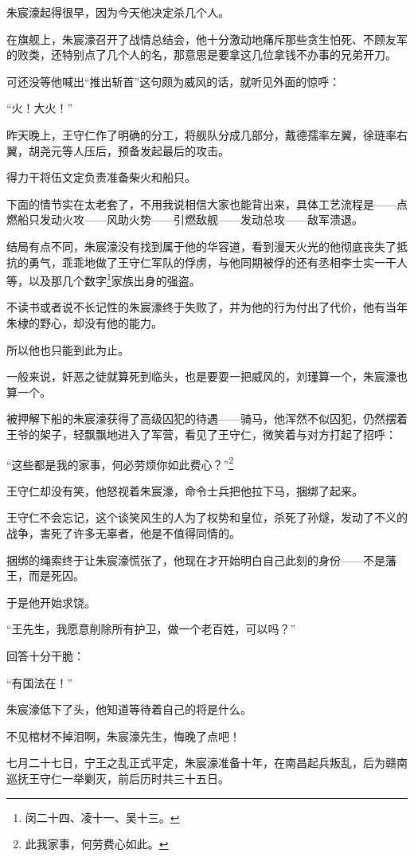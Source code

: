 \begin{multicols}{\theparacolNo}
		朱宸濠起得很早，因为今天他决定杀几个人。

		在旗舰上，朱宸濠召开了战情总结会，他十分激动地痛斥那些贪生怕死、不顾友军的败类，还特别点了几个人的名，那意思是要拿这几位拿钱不办事的兄弟开刀。

		可还没等他喊出“推出斩首”这句颇为威风的话，就听见外面的惊呼：

		“火！大火！”

		昨天晚上，王守仁作了明确的分工，将舰队分成几部分，戴德孺率左翼，徐琏率右翼，胡尧元等人压后，预备发起最后的攻击。

		得力干将伍文定负责准备柴火和船只。

		下面的情节实在太老套了，不用我说相信大家也能背出来，具体工艺流程是——点燃船只发动火攻——风助火势——引燃敌舰——发动总攻——敌军溃退。

		结局有点不同，朱宸濠没有找到属于他的华容道，看到漫天火光的他彻底丧失了抵抗的勇气，乖乖地做了王守仁军队的俘虏，与他同期被俘的还有丞相李士实一干人等，以及那几个数字\footnote{闵二十四、凌十一、吴十三。}家族出身的强盗。

		不读书或者说不长记性的朱宸濠终于失败了，并为他的行为付出了代价，他有当年朱棣的野心，却没有他的能力。

		所以他也只能到此为止。

		一般来说，奸恶之徒就算死到临头，也是要耍一把威风的，刘瑾算一个，朱宸濠也算一个。

		被押解下船的朱宸濠获得了高级囚犯的待遇——骑马，他浑然不似囚犯，仍然摆着王爷的架子，轻飘飘地进入了军营，看见了王守仁，微笑着与对方打起了招呼：

		“这些都是我的家事，何必劳烦你如此费心？”\footnote{此我家事，何劳费心如此。}

		王守仁却没有笑，他怒视着朱宸濠，命令士兵把他拉下马，捆绑了起来。

		王守仁不会忘记，这个谈笑风生的人为了权势和皇位，杀死了孙燧，发动了不义的战争，害死了许多无辜者，他是不值得同情的。

		捆绑的绳索终于让朱宸濠慌张了，他现在才开始明白自己此刻的身份——不是藩王，而是死囚。

		于是他开始求饶。

		“王先生，我愿意削除所有护卫，做一个老百姓，可以吗？”

		回答十分干脆：

		“有国法在！”

		朱宸濠低下了头，他知道等待着自己的将是什么。

		不见棺材不掉泪啊，朱宸濠先生，悔晚了点吧！

		七月二十七日，宁王之乱正式平定，朱宸濠准备十年，在南昌起兵叛乱，后为赣南巡抚王守仁一举剿灭，前后历时共三十五日。


\end{multicols}
